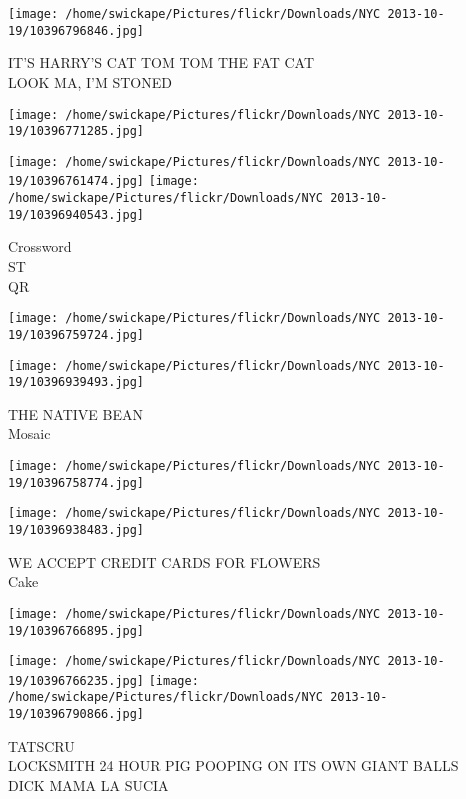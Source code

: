 \documentclass[10pt,letterpaper]{article}
\begin{document}
\vspace{0.25in}
\texttt{[image: /home/swickape/Pictures/flickr/Downloads/NYC 2013-10-19/10396796846.jpg]}

IT'S HARRY'S CAT TOM TOM THE FAT CAT\\
LOOK MA, I'M STONED\\
\pagebreak

\texttt{[image: /home/swickape/Pictures/flickr/Downloads/NYC 2013-10-19/10396771285.jpg]}

\vspace{0.25in}
\texttt{[image: /home/swickape/Pictures/flickr/Downloads/NYC 2013-10-19/10396761474.jpg]}
\texttt{[image: /home/swickape/Pictures/flickr/Downloads/NYC 2013-10-19/10396940543.jpg]}

Crossword\\
ST\\
QR\\
\pagebreak

\texttt{[image: /home/swickape/Pictures/flickr/Downloads/NYC 2013-10-19/10396759724.jpg]}

\vspace{0.25in}
\texttt{[image: /home/swickape/Pictures/flickr/Downloads/NYC 2013-10-19/10396939493.jpg]}

THE NATIVE BEAN\\
Mosaic\\
\pagebreak

\texttt{[image: /home/swickape/Pictures/flickr/Downloads/NYC 2013-10-19/10396758774.jpg]}

\vspace{0.25in}
\texttt{[image: /home/swickape/Pictures/flickr/Downloads/NYC 2013-10-19/10396938483.jpg]}

WE ACCEPT CREDIT CARDS FOR FLOWERS\\
Cake\\
\pagebreak

\texttt{[image: /home/swickape/Pictures/flickr/Downloads/NYC 2013-10-19/10396766895.jpg]}

\vspace{0.25in}
\texttt{[image: /home/swickape/Pictures/flickr/Downloads/NYC 2013-10-19/10396766235.jpg]}
\texttt{[image: /home/swickape/Pictures/flickr/Downloads/NYC 2013-10-19/10396790866.jpg]}

TATSCRU\\
LOCKSMITH 24 HOUR PIG POOPING ON ITS OWN GIANT BALLS\\
DICK MAMA LA SUCIA\\
\pagebreak
\end{document}
